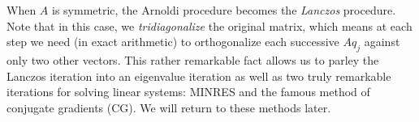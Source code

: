 \documentclass[12pt, leqno]{article} %
\begin{document}
When $A$ is symmetric, the Arnoldi procedure becomes the {\em Lanczos}
procedure.  Note that in this case, we {\em tridiagonalize} the
original matrix, which means at each step we need (in exact
arithmetic) to orthogonalize each successive $Aq_j$ against only two
other vectors.  This rather remarkable fact allows us to parley the
Lanczos iteration into an eigenvalue iteration as well as two truly
remarkable iterations for solving linear systems: MINRES and the
famous method of conjugate gradients (CG).  We will return to these
methods later.
\end{document}

